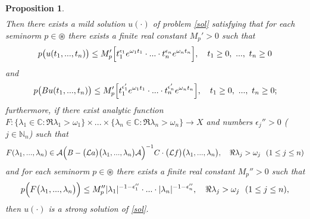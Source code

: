 \documentclass{amsart}
\newtheorem{prop}[thm]{Proposition}
\theoremstyle{definition}
\theoremstyle{remark}
\numberwithin{equation}{section}
\begin{document}
\begin{prop}
\begin{align}
\end{align} 
Then there exists a mild solution $u(\cdot)$ of problem \eqref{sol} satisfying that for each seminorm $p\in \circledast$ there exists a finite real constant $M_{p}'>0$ such that
\begin{align}\label{proc1}
p\bigl( u(t_{1},...,t_{n}) \bigr) \leq M_{p}'\Bigl[t_{1}^{\epsilon_{1}}e^{\omega_{1}t_{1}}\cdot ...\cdot t_{n}^{\epsilon_{n}}e^{\omega_{n}t_{n}}\Bigr],\quad t_{1}\geq 0,\ ...,\ t_{n}\geq 0 
\end{align}
and
\begin{align}\label{proc2}
p\bigl( Bu(t_{1},...,t_{n})\bigr) \leq M_{p}'\Bigl[t_{1}^{\epsilon_{1}'}e^{\omega_{1}t_{1}}\cdot ...\cdot t_{n}^{\epsilon_{n}'}e^{\omega_{n}t_{n}}\Bigr],\quad t_{1}\geq 0,\ ...,\ t_{n}\geq 0;
\end{align}
furthermore, if there exist analytic function $F: \{\lambda_{1} \in {\mathbb C} : \Re \lambda_{1}>\omega_{1}\} \times ... \times \{\lambda_{n} \in {\mathbb C} : \Re \lambda_{n}>\omega_{n}\} \rightarrow X$ and numbers $\epsilon_{j}''>0$ ($j\in {\mathbb N}_{n}$) such that{\small
$$
F( \lambda_{1},...,\lambda_{n}) \in {\mathcal A}\Bigl( B-\bigl({\mathcal L}a\bigr)\bigl( \lambda_{1},...,\lambda_{n}\bigr){\mathcal A} \Bigr)^{-1}C\cdot \bigl({\mathcal L}f\bigr)\bigl( \lambda_{1},...,\lambda_{n}\bigr),\quad \Re \lambda_{j}>\omega_{j}\ \ (1\leq j\leq n) 
$$}
and for each seminorm $p\in \circledast$ there exists a finite real constant $M_{p}''>0$ such that
\begin{align*} 
p\Bigl(  F\bigl( \lambda_{1},...,\lambda_{n}\bigr)\Bigr) 
\leq M_{p}''|\lambda_{1}|^{-1-\epsilon_{1}''}\cdot ...\cdot |\lambda_{n}|^{-1-\epsilon_{n}''},\quad \Re \lambda_{j}>\omega_{j}\ \ (1\leq j\leq n) ,
\end{align*} 
then $u(\cdot)$ is a strong solution of \eqref{sol}. 
\end{prop}
\end{document}
